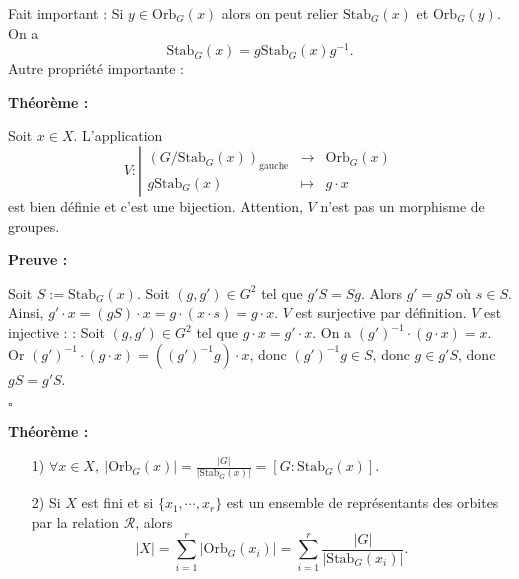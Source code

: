 \documentclass{report}
\renewenvironment{leftbar}{%
  \def\FrameCommand{\vrule width 0.4pt \hspace{10pt}}%
  \MakeFramed {\advance\hsize-\width \FrameRestore}}%
 {\endMakeFramed}%
\newenvironment{preuve}{\vspace*{0.5cm}
    \begin{leftbar}
    \noindent\textbf{Preuve :}\par}{
    \begin{flushright}
    $\square$
    \end{flushright}
    \end{leftbar}
}
\newenvironment{theoreme}[1][]{
    \begin{tcolorbox}[]
    \textbf{Théorème :} #1  \par} 
    {\end{tcolorbox}}
\newcommand{\mc}{\mathcal}
\newcommand{\D}{\right}
\newcommand{\G}{\left}
\newcommand{\jus}{\ju\vspace{0.5cm}}
\newcommand{\ju}{\justify}
\newcommand{\fonctions}[5]{\begin{displaymath}#1:\left| \begin{array}{ccc}
 #2 & \longrightarrow & #3 \\
    #4 & \longmapsto & #5 \end{array}\right.\end{displaymath}}
\begin{document}
\jus 
Fait important : Si $y\in\text{Orb}_G(x)$ alors on peut relier $\text{Stab}_G(x)$ et $\text{Orb}_G(y)$. On a 
$$\text{Stab}_G(x)=g\text{Stab}_G(x)g^{-1}.$$
Autre propriété importante :
\ju 
\begin{theoreme}
Soit $x\in X$. L’application 
\fonctions{V}{(G/\text{Stab}_G(x))_{\text{gauche}}}{\text{Orb}_G(x)}{g\text{Stab}_G(x)}{g\cdot x}
est bien définie et c’est une bijection. Attention, $V$ n’est pas un morphisme de groupes. 
\end{theoreme}
\jus 
\begin{preuve}
Soit $S:=\text{Stab}_G(x)$. Soit $(g,g')\in G^2$ tel que $g'S=Sg$. Alors $g'=gS$ où $s\in S$. Ainsi, $g'\cdot x=(gS)\cdot x=g\cdot (x\cdot s)=g\cdot x$.
\ju 
$V$ est surjective par définition. 
\ju 
$V$ est injective : : Soit $(g,g')\in G^2$ tel que $g\cdot x=g'\cdot x$. On a $(g')^{-1}\cdot (g\cdot x)=x$. Or $(g')^{-1}\cdot (g\cdot x)=((g')^{-1}g)\cdot x$, donc $(g')^{-1}g\in S$, donc $g\in g'S$, donc $gS=g'S$.  
\end{preuve}
\ju 
\begin{theoreme}
\begin{itemize}
\item[1)] $\forall x\in X,\ \G|\text{Orb}_G(x)\D|=\frac{|G|}{|\text{Stab}_G(x)|}=[G:\text{Stab}_G(x)]$. 
\item[2)] Si $X$ est fini et si $\{x_1,\cdots,x_r\}$ est un ensemble de représentants des orbites par la relation $\mc{R}$, alors 
$$|X|=\sum_{i=1}^{r}|\text{Orb}_G(x_i)|= \sum_{i=1}^{r}\frac{|G|}{|\text{Stab}_G(x_i)|}.$$
\end{itemize}
\end{theoreme}
\end{document}

